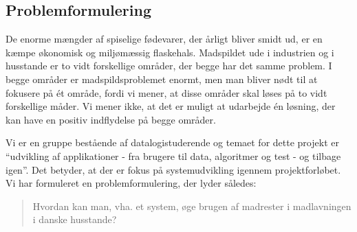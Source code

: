 \subsection{Problemformulering}
\label{subsec:problemformulering}

De enorme mængder af spiselige fødevarer, der årligt bliver smidt ud, er en kæmpe økonomisk og miljømæssig flaskehals. Madspildet ude i industrien og i husstande er to vidt forskellige områder, der begge har det samme problem. I begge områder er madspildsproblemet enormt, men man bliver nødt til at fokusere på ét område, fordi vi mener, at disse områder skal løses på to vidt forskellige måder. Vi mener ikke, at det er muligt at udarbejde én løsning, der kan have en positiv indflydelse på begge områder. 

Vi er en gruppe bestående af datalogistuderende og temaet for dette projekt er ``udvikling af applikationer - fra brugere til data, algoritmer og test - og tilbage igen''. Det betyder, at der er fokus på systemudvikling igennem projektforløbet. Vi har formuleret en problemformulering, der lyder således:

\begin{quote}
Hvordan kan man, vha. et system, øge brugen af madrester i madlavningen i danske husstande?
\end{quote} 
